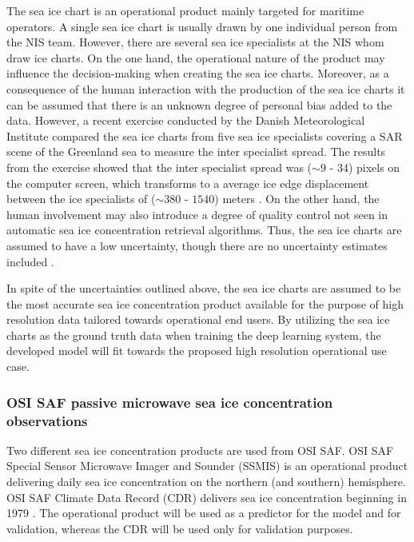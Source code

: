 \documentclass[../main/thesis.tex]{subfiles}
\begin{document}
The sea ice chart is an operational product mainly targeted for maritime operators. A single sea ice chart is usually drawn by one individual person from the NIS team. However, there are several sea ice specialists at the NIS whom draw ice charts. On the one hand, the operational nature of the product may influence the decision-making when creating the sea ice charts. Moreover, as a consequence of the human interaction with the production of the sea ice charts it can be assumed that there is an unknown degree of personal bias added to the data. However, a recent exercise conducted by the Danish Meteorological Institute compared the sea ice charts from five sea ice specialists covering a SAR scene of the Greenland sea to measure the inter specialist spread. The results from the exercise showed that the inter specialist spread was ($\sim9$ - 34) pixels on the computer screen, which transforms to a average ice edge displacement between the ice specialists of ($\sim380$ - $1540$) meters \citep{Kreiner2023}. On the other hand, the human involvement may also introduce a degree of quality control not seen in automatic sea ice concentration retrieval algorithms. Thus, the sea ice charts are assumed to have a low uncertainty, though there are no uncertainty estimates included \citep{Dinessen2020}.

In spite of the uncertainties outlined above, the sea ice charts are assumed to be the most accurate sea ice concentration product available for the purpose of high resolution data tailored towards operational end users. By utilizing the sea ice charts as the ground truth data when training the deep learning system, the developed model will fit towards the proposed high resolution operational use case.

\subsubsection{OSI SAF passive microwave sea ice concentration observations}
\label{sec:osisaf}
Two different sea ice concentration products are used from OSI SAF. OSI SAF Special Sensor Microwave Imager and Sounder (SSMIS) is an operational product delivering daily sea ice concentration on the northern (and southern) hemisphere. OSI SAF Climate Data Record (CDR) \citep{Soerensen2021} delivers sea ice concentration beginning in 1979 \citep{Lavergne2019}. The operational product will be used as a predictor for the model and for validation, whereas the CDR will be used only for validation purposes.
\end{document}
